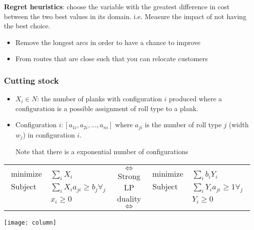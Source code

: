 \textbf{Regret heuristics}: choose the variable with the
greatest difference in cost between the two best values in
its domain. i.e. Measure the impact of not having the best
choice.

\begin{itemize}
    \item Remove the longest arcs in order to have a chance to improve
    \item From routes that are close such that you can relocate customers
\end{itemize}

\subsubsection{Cutting stock}

    \begin{itemize}
        \item $X_i \in N$: the number of planks with configuration $i$
            produced where a configuration is a possible assignment of
            roll type to a plank.

        \item Configuration $i: [a_{1i}, a_{2i}, ..., a_{ni}]$ where
            $a_{ji}$ is the number of roll type $j$ (width $w_j$) in
            configuration $i$.

            Note that there is a exponential number of
            configurations
    \end{itemize}

\begin{tabular}{m{5cm}cm{5cm}}
    \begin{eqnarray*}
        \textrm{minimize } & \sum_i X_i \\
        \textrm{Subject to } & \sum_i X_i a_{ji} \geq b_j
        \forall_j\\
        & x_i \geq 0
    \end{eqnarray*}
    & $\Leftrightarrow$ Strong LP duality $\Leftrightarrow$ & 
    \begin{eqnarray*}
        \textrm{minimize } & \sum_i b_i Y_i \\
        \textrm{Subject to } & \sum_i Y_i a_{ji} \geq 1
        \forall_j \\
        & Y_i \geq 0
    \end{eqnarray*}
\end{tabular}

\begin{center}
\texttt{[image: column]}
\end{center}

